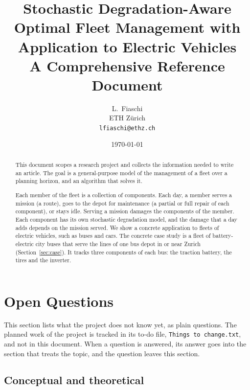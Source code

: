 \documentclass[11pt,a4paper]{article}
\theoremstyle{plain}
\theoremstyle{definition}
\theoremstyle{remark}
\begin{document}
\title{\textbf{Stochastic Degradation-Aware Optimal Fleet Management with Application to Electric Vehicles}\\[6pt]
{\normalsize A Comprehensive Reference Document}}
\author{L.\ Fiaschi \\ \small ETH Z\"urich \\ \small \texttt{lfiaschi@ethz.ch}}
\date{\today}

\maketitle
\begin{abstract}
This document scopes a research project and collects the information needed to write an article.
The goal is a general-purpose model of the management of a fleet over a planning horizon, and an algorithm that solves it.

Each member of the fleet is a collection of components.
Each day, a member serves a mission (a route), goes to the depot for maintenance (a partial or full repair of each component), or stays idle.
Serving a mission damages the components of the member.
Each component has its own stochastic degradation model, and the damage that a day adds depends on the mission served.
We show a concrete application to fleets of electric vehicles, such as buses and cars.
The concrete case study is a fleet of battery-electric city buses that serve the lines of one bus depot in or near Zurich (Section~\ref{sec:case}).
It tracks three components of each bus: the traction battery, the tires and the inverter.
\end{abstract}
\tableofcontents
\newpage

\section{Open Questions}
\label{sec:open_questions}

This section lists what the project does not know yet, as plain questions.
The planned work of the project is tracked in its to-do file, \texttt{Things to change.txt}, and not in this document.
When a question is answered, its answer goes into the section that treats the topic, and the question leaves this section.

\subsection{Conceptual and theoretical}
\end{document}
